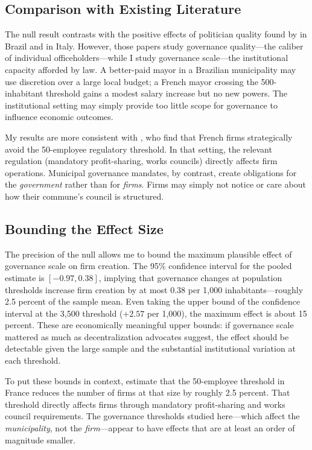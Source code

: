 \documentclass[12pt]{article}
\begin{document}
\subsection{Comparison with Existing Literature}

The null result contrasts with the positive effects of politician quality found by \citet{ferraz2011} in Brazil and \citet{gagliarducci2013} in Italy. However, those papers study governance quality---the caliber of individual officeholders---while I study governance scale---the institutional capacity afforded by law. A better-paid mayor in a Brazilian municipality may use discretion over a large local budget; a French mayor crossing the 500-inhabitant threshold gains a modest salary increase but no new powers. The institutional setting may simply provide too little scope for governance to influence economic outcomes.

My results are more consistent with \citet{garicano2016}, who find that French firms strategically avoid the 50-employee regulatory threshold. In that setting, the relevant regulation (mandatory profit-sharing, works councils) directly affects firm operations. Municipal governance mandates, by contrast, create obligations for the \textit{government} rather than for \textit{firms}. Firms may simply not notice or care about how their commune's council is structured.

\subsection{Bounding the Effect Size}

The precision of the null allows me to bound the maximum plausible effect of governance scale on firm creation. The 95\% confidence interval for the pooled estimate is $[-0.97, 0.38]$, implying that governance changes at population thresholds increase firm creation by at most 0.38 per 1,000 inhabitants---roughly 2.5 percent of the sample mean. Even taking the upper bound of the confidence interval at the 3,500 threshold ($+2.57$ per 1,000), the maximum effect is about 15 percent. These are economically meaningful upper bounds: if governance scale mattered as much as decentralization advocates suggest, the effect should be detectable given the large sample and the substantial institutional variation at each threshold.

To put these bounds in context, \citet{garicano2016} estimate that the 50-employee threshold in France reduces the number of firms at that size by roughly 2.5 percent. That threshold directly affects firms through mandatory profit-sharing and works council requirements. The governance thresholds studied here---which affect the \textit{municipality}, not the \textit{firm}---appear to have effects that are at least an order of magnitude smaller.
\end{document}
